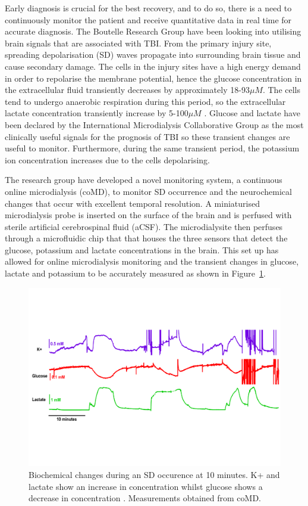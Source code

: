 Early diagnosis is crucial for the best recovery, and to do so, there is a need to continuously monitor the patient and receive quantitative data in real time for accurate diagnosis. The Boutelle Research Group have been looking into utilising brain signals that are associated with TBI. From the primary injury site, spreading depolarisation (SD) waves propagate into surrounding brain tissue and cause secondary damage. The cells in the injury sites have a high energy demand in order to repolarise the membrane potential, hence the glucose concentration in the extracellular fluid transiently decreases by approximately 18-93$\mu M$. The cells tend to undergo anaerobic respiration during this period, so the extracellular lactate concentration transiently increase by 5-100$\mu M$ \cite{D.2010}. Glucose and lactate have been declared by the International Microdialysis Collaborative Group as the most clinically useful signals for the prognosis of TBI \cite{Hutchinson2015} so these transient changes are useful to monitor. Furthermore, during the same transient period, the potassium ion concentration increases \cite{Rogers:2011:10.1039/c0cp02810j} due to the cells depolarising.

The research group have developed a novel monitoring system, a continuous online microdialysis (coMD), to monitor SD occurrence and the neurochemical changes that occur with excellent temporal resolution. A miniaturised microdialysis probe is inserted on the surface of the brain and is perfused with sterile artificial cerebrospinal fluid (aCSF). The microdialysite then perfuses through a microfluidic chip that that houses the three sensors that detect the glucose, potassium and lactate concentrations in the brain. This set up has allowed for online microdialysis monitoring and the transient changes in glucose, lactate and potassium to be accurately measured \cite{Rogers2017} as shown in Figure~\ref{fig: SD}.

\begin{figure}[t]
\centering
\includegraphics[trim={0cm 5cm 0.5cm  5cm}, clip, width=1\textwidth]{./figures/conc.pdf}
\captionsetup{justification=centering}
\caption{Biochemical changes during an SD occurence at 10 minutes. K+ and lactate show an increase in concentration whilst glucose shows a decrease in concentration \cite{Rogers2017}. Measurements obtained from coMD.}
\label{fig: SD}
\end{figure}

